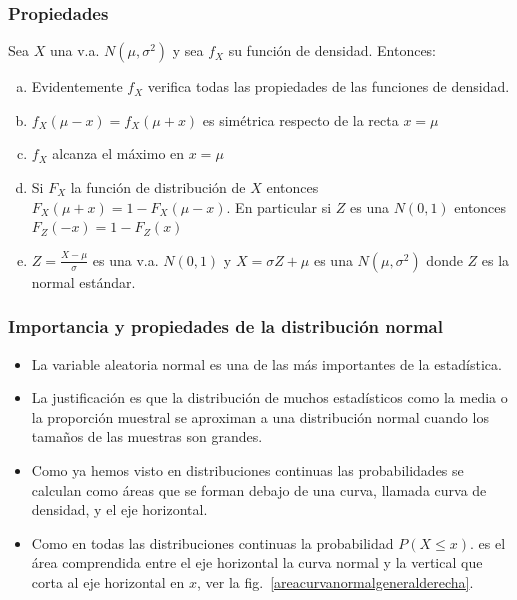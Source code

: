 \begin{frame}
\frametitle{Propiedades} 
Sea $X$ una v.a. $N(\mu,\sigma^2)$ y sea $f_{X}$ su funci\'on de densidad. Entonces:
\begin{enumerate}[a)]
\item Evidentemente $f_{X}$ verifica todas las propiedades de las funciones de densidad.
\item $f_{X}(\mu-x)=f_{X}(\mu+x)$ es simétrica respecto de la recta $x=\mu$
\item $f_{X}$ alcanza el máximo en $x=\mu$
\item Si $F_{X}$ la función de distribución de $X$ entonces  $F_{X}(\mu+x)=1-F_{X}(\mu-x)$. En particular si $Z$ es una $N(0,1)$ entonces $F_{Z}(-x)=1-F_{Z}(x)$
\item $Z=\frac{X-\mu}{\sigma}$ es una v.a. $N(0,1)$ y $X=\sigma Z+\mu$ es una $N(\mu,\sigma^{2})$ donde $Z$ es la normal estándar.
\end{enumerate}
\end{frame}


\begin{frame}
\frametitle{Importancia  y propiedades de la distribución normal}
\begin{itemize}
\item  La variable aleatoria normal es una de las más importantes de la estadística.
\item  La justificación es que la distribución de muchos estadísticos como la media o la proporción muestral se aproximan  a una distribución normal cuando los tamaños de las muestras son grandes.
\item 
Como ya hemos visto en distribuciones continuas las probabilidades se calculan como áreas que se forman debajo de una curva, llamada curva de densidad, y el eje horizontal.
 \item  Como en todas las distribuciones continuas la probabilidad $P(X\leq x)$. es el área comprendida entre el eje horizontal la curva normal y la vertical que corta al eje horizontal en $x$, ver la fig.~\ref{areacurvanormalgeneralderecha}.
\end{itemize}
\end{frame}
 
